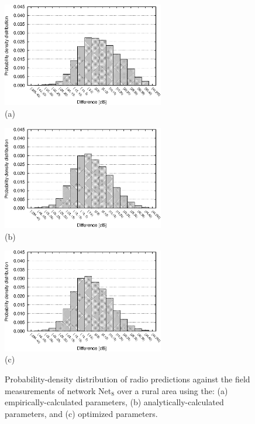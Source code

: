 \begin{figure}
\centering

\includegraphics[width=0.63\textwidth]{05-framework_parameter_tuning/img/rural-default_distribution}\\\hspace*{0.3in}(a)\vspace{5mm}

\includegraphics[width=0.63\textwidth]{05-framework_parameter_tuning/img/rural-fitted_distribution}\\\hspace*{0.3in}(b)\vspace{5mm}

\includegraphics[width=0.63\textwidth]{05-framework_parameter_tuning/img/rural-optim_distribution}\\\hspace*{0.3in}(c)\vspace{5mm}\caption{Probability-density distribution of radio predictions against the
field measurements of network Net$_{8}$ over a rural area using the:
(a) empirically-calculated parameters, (b) analytically-calculated
parameters, and (c) optimized parameters.\label{fig:05-Error_distribution_for_Net8}}
\end{figure}


